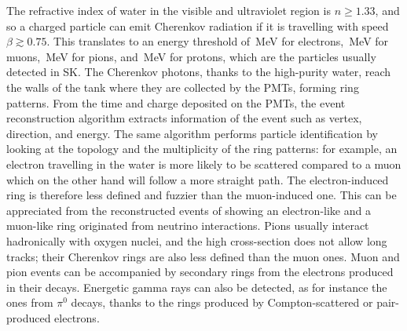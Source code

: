 The refractive index of water in the visible and ultraviolet region is $n \geq 1.33$, %
and so a charged particle can emit Cherenkov radiation if it is travelling %
with speed $\beta \gtrsim 0.75$.
This translates to an energy threshold of \,MeV for electrons, \,MeV for muons, %
\,MeV for pions, and \,MeV for protons, which are the particles usually detected in SK.
The Cherenkov photons, thanks to the high-purity water, reach the walls of the tank where they %
are collected by the PMTs, forming ring patterns.
From the time and charge deposited on the PMTs, the event reconstruction algorithm extracts information of the event %
such as vertex, direction, and energy.
The same algorithm performs particle identification by looking at the topology and the multiplicity of the ring patterns: %
for example, an electron travelling in the water is more likely to be scattered compared to a muon %
which on the other hand will follow a more straight path.
The electron-induced ring is therefore less defined and fuzzier than the muon-induced one.
This can be appreciated from the reconstructed events of  showing an electron-like and %
a muon-like ring originated from neutrino interactions.
Pions usually interact hadronically with oxygen nuclei, and the high cross-section does not allow long tracks; %
their Cherenkov rings are also less defined than the muon ones.
Muon and pion events can be accompanied by secondary rings from the electrons produced in their decays.
Energetic gamma rays can also be detected, as for instance the ones from $\pi^0$ decays, %
thanks to the rings produced by Compton-scattered or pair-produced electrons.


